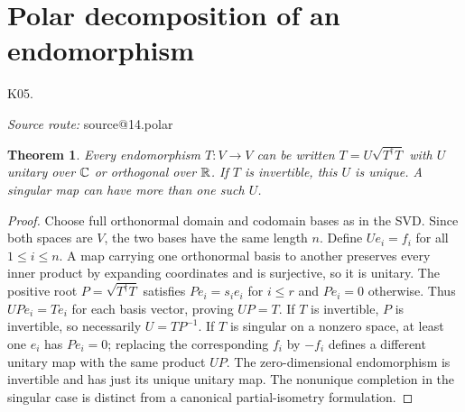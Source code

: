 \documentclass[11pt,a4paper]{book}
\makeatletter
\newtheorem{theorem}{Theorem}[chapter]
\theoremstyle{definition}\newtheorem{definition}[theorem]{Definition}
\theoremstyle{remark}\newtheorem{remark}[theorem]{Remark}
\newcommand{\Kentry}[2]{\section{#2}\label{k:#1}\noindent\textsf{\small K05.\detokenize{#1}}\par
  \begingroup\small\color{black!65}\textit{Source route: }\csname source@#1\endcsname\par\endgroup}
\makeatother
\begin{document}
\Kentry{14.polar}{Polar decomposition of an endomorphism}
\begin{theorem}
Every endomorphism $T:V\to V$ can be written
$T=U\sqrt{T^\dagger T}$ with $U$ unitary over $\mathbb C$ or orthogonal over $\mathbb R$. If $T$ is invertible, this $U$ is unique. A singular map can have more than one such $U$.
\end{theorem}
\begin{proof}
Choose full orthonormal domain and codomain bases as in the SVD. Since both spaces are $V$, the two bases have the same length $n$. Define $Ue_i=f_i$ for all $1\le i\le n$. A map carrying one orthonormal basis to another preserves every inner product by expanding coordinates and is surjective, so it is unitary. The positive root $P=\sqrt{T^\dagger T}$ satisfies $Pe_i=s_i e_i$ for $i\le r$ and $Pe_i=0$ otherwise. Thus $UPe_i=Te_i$ for each basis vector, proving $UP=T$. If $T$ is invertible, $P$ is invertible, so necessarily $U=TP^{-1}$. If $T$ is singular on a nonzero space, at least one $e_i$ has $Pe_i=0$; replacing the corresponding $f_i$ by $-f_i$ defines a different unitary map with the same product $UP$. The zero-dimensional endomorphism is invertible and has just its unique unitary map. The nonunique completion in the singular case is distinct from a canonical partial-isometry formulation.
\end{proof}
\end{document}
